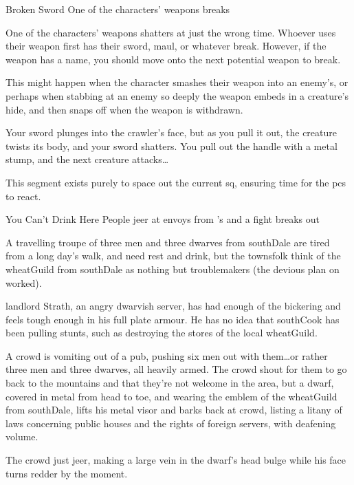 {Broken Sword}%
{One of the characters' weapons breaks}%

One of the characters' \glspl{weapon} shatters at just the wrong time.
Whoever uses their \gls{weapon} first has their sword, maul, or whatever break.
However, if the weapon has a name, you should move onto the next potential weapon to break.

This might happen when the character smashes their weapon into an enemy's, or perhaps when stabbing at an enemy so deeply the weapon embeds in a creature's hide, and then snaps off when the weapon is withdrawn.

\begin{boxtext}
  Your sword plunges into the \gls{crawler}'s face, but as you pull it out, the creature twists its body, and your sword shatters.
  You pull out the handle with a metal stump, and the next creature attacks\ldots
\end{boxtext}

This \gls{segment} exists purely to space out the current \gls{sq}, ensuring time for the \glspl{pc} to react.

{You Can't Drink Here}%
{People jeer at envoys from 's  and a fight breaks out}%

A travelling troupe of three men and three dwarves from \gls{southDale} are tired from a long day's walk, and need rest and drink, but the townsfolk think of the \gls{wheatGuild} from \gls{southDale} as nothing but troublemakers (the devious plan on  worked).

\Gls{landlord} Strath, an angry dwarvish \gls{server}, has had enough of the bickering and feels tough enough in his full plate armour.
He has no idea that \gls{southCook} has been pulling stunts, such as destroying the stores of the local \gls{wheatGuild}.

\begin{boxtext}
  A crowd is vomiting out of a pub, pushing six men out with them\ldots or rather three men and three dwarves, all heavily armed.
  The crowd shout for them to go back to the mountains and that they're not welcome in the area, but a dwarf, covered in metal from head to toe, and wearing the emblem of the \gls{wheatGuild} from \gls{southDale}, lifts his metal visor and barks back at crowd, listing a litany of laws concerning public houses and the rights of foreign \glspl{server}, with deafening volume.

  The crowd just jeer, making a large vein in the dwarf's head bulge while his face turns redder by the moment.
\end{boxtext}

